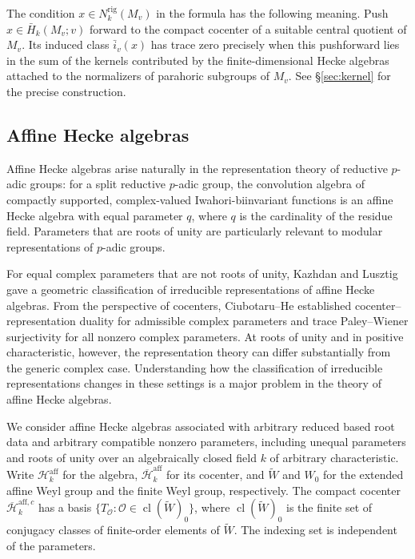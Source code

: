 \documentclass[11pt,letterpaper]{amsart}
\theoremstyle{definition}
\numberwithin{equation}{section}
\numberwithin{theorem}{section}
\newcommand{\kk}{k}
\newcommand{\cH}{\mathcal H}
\newcommand{\bH}{\overline{\mathcal H}}
\newcommand{\cO}{\mathcal O}
\newcommand{\Wt}{\tilde W}
\newcommand{\rig}{\mathrm{rig}}
\begin{document}
The condition $x\in N_\kk^{\rig}(M_v)$ in the formula has the following meaning. Push $x\in\bar H_\kk(M_v;v)$ forward to the compact cocenter of a suitable central quotient of $M_v$. Its induced class $\bar i_v(x)$ has trace zero precisely when this pushforward lies in the sum of the kernels contributed by the finite-dimensional Hecke algebras attached to the normalizers of parahoric subgroups of $M_v$. See \S\ref{sec:kernel} for the precise construction.

\subsection{Affine Hecke algebras}

Affine Hecke algebras arise naturally in the representation
theory of reductive $p$-adic groups: for a split reductive $p$-adic group, the convolution algebra of compactly supported, complex-valued
Iwahori-biinvariant functions is an affine Hecke algebra
with equal parameter $q$, where $q$ is the cardinality
of the residue field.
Parameters that are roots of unity are particularly relevant
to modular representations of $p$-adic groups.

For equal complex parameters that are not roots of unity,
Kazhdan and Lusztig \cite{KL} gave a geometric classification
of irreducible representations of affine Hecke algebras.
From the perspective of cocenters, Ciubotaru--He \cite{CH}
established cocenter--representation duality for admissible
complex parameters and trace Paley--Wiener surjectivity
for all nonzero complex parameters.
At roots of unity and in positive characteristic, however,
the representation theory can differ substantially from
the generic complex case. Understanding how the classification of irreducible representations changes in these settings is a major problem in the theory of affine Hecke algebras.

We consider affine Hecke algebras associated with arbitrary
reduced based root data and arbitrary compatible nonzero
parameters, including unequal parameters and roots of unity over an algebraically closed field $\kk$ of arbitrary characteristic.
Write $\cH_\kk^{\mathrm{aff}}$ for the algebra,
$\bH_\kk^{\mathrm{aff}}$ for its cocenter,
and $\Wt$ and $W_0$ for the extended affine Weyl group
and the finite Weyl group, respectively.
The compact cocenter $\bH_\kk^{\mathrm{aff},c}$ has a basis $\{T_{\cO}:\cO\in\operatorname{cl}(\Wt)_0\}$,
where $\operatorname{cl}(\Wt)_0$ is the finite set of
conjugacy classes of finite-order elements of $\Wt$. The indexing set is independent of the parameters.
\end{document}
